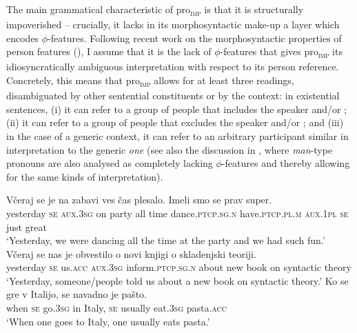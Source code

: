 \documentclass[output=paper,nonflat,newtxmath]{langsci/langscibook}
\begin{document}
The main grammatical characteristic of pro\textsubscript{\textsc{imp}} is that it is structurally impoverished -- crucially, it lacks in its morphosyntactic make-up a layer which encodes $\phi$-features. Following recent work on the morphosyntactic properties of person features (\citealt{ackema2013,ackema2018}), I assume that it is the lack of $\phi$-features that gives pro\textsubscript{\textsc{imp}} its idiosyncratically ambiguous interpretation with respect to its person reference. Concretely, this means that pro\textsubscript{\textsc{imp}} allows for at least  three readings, disambiguated by other sentential constituents or by the context: in existential sentences, (i) it can refer to a group of people that includes the speaker and/or  ; (ii) it can refer to a group of people that excludes the speaker and/or  ; and (iii) in the case of a generic context, it can refer to an arbitrary participant similar in interpretation to the  generic  \textit{one}  (see also the discussion in \citealt{Fenger2017}, where  \textit{man}-type pronouns are also analysed as completely lacking $\phi$-features and thereby allowing for the same kinds of interpretation).
\largerpage[2]


\begin{exe}
\ex \label{ex:lenardic: 20} \gll Včeraj se je na zabavi ves čas plesalo. Imeli smo se prav super.\\
yesterday \textsc{se} \textsc{aux}.\textsc{3sg} on party all time dance.\textsc{ptcp.sg.n} have.\textsc{ptcp.pl.m} \textsc{aux}.\textsc{1pl} \textsc{se} just great\\
\trans `Yesterday, we were dancing all the time at the party and we had such fun.'
\ex \label{ex:lenardic: 21} \gll Včeraj se nas je obvestilo o novi knjigi o skladenjski teoriji.\\
yesterday \textsc{se} us.\textsc{acc} \textsc{aux}.\textsc{3sg} inform.\textsc{ptcp.sg.n} about new book on syntactic theory\\
\trans `Yesterday, someone/people told us about a new book on syntactic theory.'
\ex \label{ex:lenardic: 22} \gll Ko se gre v Italijo, se navadno je pašto.\\
when \textsc{se} go.\textsc{3sg} in Italy, \textsc{se} usually eat.\textsc{3sg} pasta.\textsc{acc}\\
\trans `When one goes to Italy, one usually eats pasta.'
\end{exe}
\end{document}
